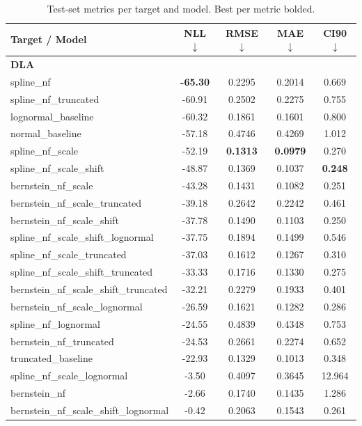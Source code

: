 \begin{table}[t]
\centering
\caption{Test-set metrics per target and model. Best per metric bolded.}
\label{tab:model_comparison}
\small
\begin{tabular}{lcccc}
\toprule
Target / Model & NLL $\downarrow$ & RMSE $\downarrow$ & MAE $\downarrow$ & CI90 $\downarrow$ \\
\midrule
\multicolumn{5}{l}{\textbf{DLA}} \\
  spline\_nf & \textbf{-65.30} & 0.2295 & 0.2014 & 0.669 \\
  spline\_nf\_truncated & -60.91 & 0.2502 & 0.2275 & 0.755 \\
  lognormal\_baseline & -60.32 & 0.1861 & 0.1601 & 0.800 \\
  normal\_baseline & -57.18 & 0.4746 & 0.4269 & 1.012 \\
  spline\_nf\_scale & -52.19 & \textbf{0.1313} & \textbf{0.0979} & 0.270 \\
  spline\_nf\_scale\_shift & -48.87 & 0.1369 & 0.1037 & \textbf{0.248} \\
  bernstein\_nf\_scale & -43.28 & 0.1431 & 0.1082 & 0.251 \\
  bernstein\_nf\_scale\_truncated & -39.18 & 0.2642 & 0.2242 & 0.461 \\
  bernstein\_nf\_scale\_shift & -37.78 & 0.1490 & 0.1103 & 0.250 \\
  spline\_nf\_scale\_shift\_lognormal & -37.75 & 0.1894 & 0.1499 & 0.546 \\
  spline\_nf\_scale\_truncated & -37.03 & 0.1612 & 0.1267 & 0.310 \\
  spline\_nf\_scale\_shift\_truncated & -33.33 & 0.1716 & 0.1330 & 0.275 \\
  bernstein\_nf\_scale\_shift\_truncated & -32.21 & 0.2279 & 0.1933 & 0.401 \\
  bernstein\_nf\_scale\_lognormal & -26.59 & 0.1621 & 0.1282 & 0.286 \\
  spline\_nf\_lognormal & -24.55 & 0.4839 & 0.4348 & 0.753 \\
  bernstein\_nf\_truncated & -24.53 & 0.2661 & 0.2274 & 0.652 \\
  truncated\_baseline & -22.93 & 0.1329 & 0.1013 & 0.348 \\
  spline\_nf\_scale\_lognormal & -3.50 & 0.4097 & 0.3645 & 12.964 \\
  bernstein\_nf & -2.66 & 0.1740 & 0.1435 & 1.286 \\
  bernstein\_nf\_scale\_shift\_lognormal & -0.42 & 0.2063 & 0.1543 & 0.261 \\

\end{tabular}
\end{table}
